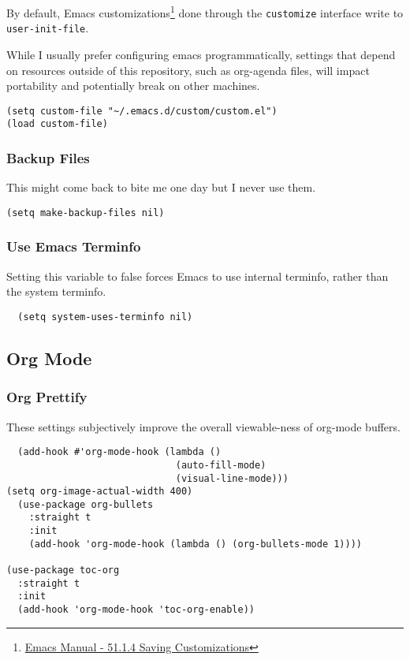 \documentclass[11pt]{article}
\begin{document}
By default, Emacs customizations\footnote{\href{https://www.gnu.org/software/emacs/manual/html\_node/emacs/Saving-Customizations.html}{Emacs Manual - 51.1.4 Saving Customizations}} done through the \texttt{customize}
interface write to \texttt{user-init-file}.

While I usually prefer configuring emacs programmatically, settings
that depend on resources outside of this repository, such as
org-agenda files, will impact portability and potentially break on
other machines.

\begin{verbatim}
(setq custom-file "~/.emacs.d/custom/custom.el")
(load custom-file)
\end{verbatim}

\subsubsection*{Backup Files}
\label{sec:org063da41}

This might come back to bite me one day but I never use them.

\begin{verbatim}
(setq make-backup-files nil)
\end{verbatim}

\subsubsection*{Use Emacs Terminfo}
\label{sec:orgdcfcc9b}
Setting this variable to false forces Emacs to use internal terminfo,
rather than the system terminfo.

\begin{verbatim}
  (setq system-uses-terminfo nil)
\end{verbatim}

\subsection*{Org Mode}
\label{sec:org8728288}

\subsubsection*{Org Prettify}
\label{sec:org634f915}

These settings subjectively improve the overall viewable-ness of
org-mode buffers.

\begin{verbatim}
  (add-hook #'org-mode-hook (lambda ()
                              (auto-fill-mode)
                              (visual-line-mode)))
(setq org-image-actual-width 400)
  (use-package org-bullets
    :straight t
    :init
    (add-hook 'org-mode-hook (lambda () (org-bullets-mode 1))))

(use-package toc-org
  :straight t
  :init
  (add-hook 'org-mode-hook 'toc-org-enable))
\end{verbatim}
\end{document}

